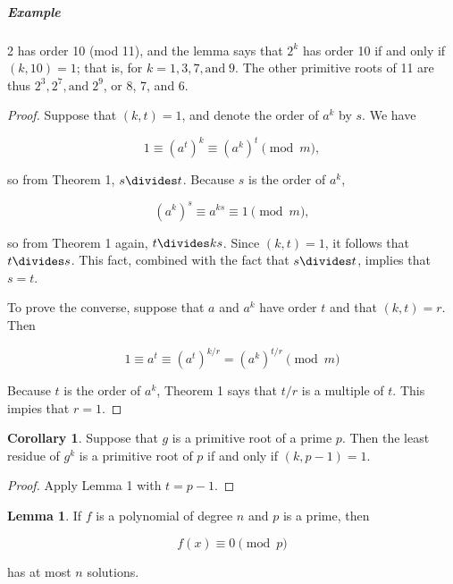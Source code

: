 \documentclass{article}
\theoremstyle{definition} %
\theoremstyle{definition}
\newtheorem{corollary}{Corollary}[section] %
\theoremstyle{definition}
\newtheorem{lemma}{Lemma}[section]
\theoremstyle{definition}
\begin{document}
  \subparagraph{Example} 2 has order 10 (mod 11), and the lemma says that $2^k$ has order
  10 if and only if $(k, 10) = 1$; that is, for $k = 1, 3, 7, \text{and}\;9$. The other primitive roots of 11
  are thus $2^3, 2^7, \text{and}\; 2^9$, or 8, 7, and 6.
  
  \begin{proof}
    Suppose that $(k, t) = 1$, and denote the order of $a^k$ by $s$. We have
    
    \[ 1 \equiv (a^t)^k \equiv (a^k)^t \pmod{m}, \]
    
    so from Theorem 1, $s \divides t$. Because $s$ is the order of $a^k$,
    
    \[ (a^k)^s \equiv a^{ks} \equiv 1 \pmod{m}, \]
    
    so from Theorem 1 again, $t \divides ks$. Since $(k, t) = 1$, it follows that
    $t \divides s$. This fact, combined with the fact that $s \divides t$, implies that
    $s = t$.
    
    To prove the converse, suppose that $a$ and $a^k$ have order $t$ and
    that $(k, t) = r$. Then
    
    \[ 1 \equiv a^t \equiv (a^t)^{k / r} = (a^k)^{t / r} \pmod{m} \]
    
    Because $t$ is the order of $a^k$, Theorem 1 says that $t/r$ is
    a multiple of $t$. This impies that $r = 1$.
  \end{proof}
  
  \begin{corollary}
    Suppose that $g$ is a primitive root of a prime $p$. Then the least residue of
    $g^k$ is a primitive root of $p$ if and only if $(k, p - 1) = 1$.
  \end{corollary}
  
  \begin{proof}
    Apply Lemma 1 with $t = p - 1$.
  \end{proof}
  
  \begin{lemma}
    If $f$ is a polynomial of degree $n$ and $p$ is a prime, then
    
    \begin{equation}
      f(x) \equiv 0 \pmod{p} \label{eq:1BCCEB6C-B77A-4DFC-87D8-B38F8C8BF96B}
    \end{equation}
    
    has at most $n$ solutions.
  \end{lemma}
  
\end{document}

